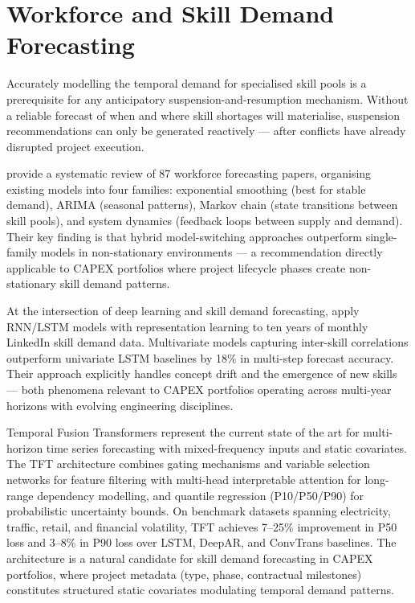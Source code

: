 \section{Workforce and Skill Demand Forecasting}
\label{sec:lit_forecasting}

Accurately modelling the temporal demand for specialised skill pools is a prerequisite for
any anticipatory suspension-and-resumption mechanism. Without a reliable forecast of when
and where skill shortages will materialise, suspension recommendations can only be generated
reactively — after conflicts have already disrupted project execution.

\textcite{safarishahrbijari2018workforce} provide a systematic review of 87 workforce
forecasting papers, organising existing models into four families: exponential smoothing (best
for stable demand), ARIMA (seasonal patterns), Markov chain (state transitions between skill
pools), and system dynamics (feedback loops between supply and demand). Their key finding is
that hybrid model-switching approaches outperform single-family models in non-stationary
environments — a recommendation directly applicable to CAPEX portfolios where project
lifecycle phases create non-stationary skill demand patterns.

At the intersection of deep learning and skill demand forecasting, \textcite{macedo2022skills}
apply RNN/LSTM models with representation learning to ten years of monthly LinkedIn skill
demand data. Multivariate models capturing inter-skill correlations outperform univariate
LSTM baselines by 18\% in multi-step forecast accuracy. Their approach explicitly handles
concept drift and the emergence of new skills — both phenomena relevant to CAPEX portfolios
operating across multi-year horizons with evolving engineering disciplines.

Temporal Fusion Transformers \parencite{lim2021tft} represent the current state of the art for
multi-horizon time series forecasting with mixed-frequency inputs and static covariates. The
TFT architecture combines gating mechanisms and variable selection networks for feature
filtering with multi-head interpretable attention for long-range dependency modelling, and
quantile regression (P10/P50/P90) for probabilistic uncertainty bounds. On benchmark datasets
spanning electricity, traffic, retail, and financial volatility, TFT achieves 7--25\%
improvement in P50 loss and 3--8\% in P90 loss over LSTM, DeepAR, and ConvTrans baselines.
The architecture is a natural candidate for skill demand forecasting in CAPEX portfolios,
where project metadata (type, phase, contractual milestones) constitutes structured static
covariates modulating temporal demand patterns.

